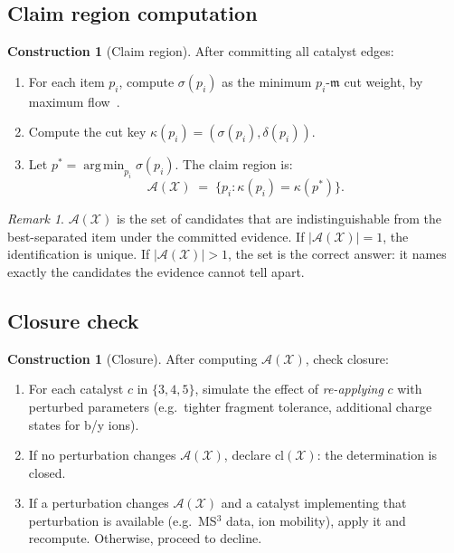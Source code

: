 \documentclass[11pt,a4paper]{article}
\theoremstyle{definition}
\newtheorem{construction}[theorem]{Construction}
\theoremstyle{remark}
\newtheorem{remark}[theorem]{Remark}
\newcommand{\med}{\mathfrak{m}}
\newcommand{\sep}{\sigma}
\newcommand{\dep}{\delta}
\newcommand{\key}{\kappa}
\newcommand{\clos}{\mathrm{cl}}
\newcommand{\amb}{\mathcal{A}}
\newcommand{\Spec}{\mathcal{X}}
\DeclareMathOperator*{\argmin}{arg\,min}
\begin{document}
\subsection{Claim region computation}

\begin{construction}[Claim region]
\label{con:claim}
After committing all catalyst edges:
\begin{enumerate}[leftmargin=2.0em,itemsep=1pt]
  \item For each item $p_i$, compute $\sep(p_i)$ as the minimum
  $p_i$-$\med$ cut weight, by maximum
  flow~\citep{fordfulkerson1956,goldberg1988new}.
  \item Compute the cut key $\key(p_i)=(\sep(p_i),\dep(p_i))$.
  \item Let $p^{\ast}=\argmin_{p_i}\sep(p_i)$. The claim region is:
  \[
    \amb(\Spec) \;=\; \{p_i : \key(p_i)=\key(p^{\ast})\}.
  \]
\end{enumerate}
\end{construction}

\begin{remark}
$\amb(\Spec)$ is the set of candidates that are indistinguishable from
the best-separated item under the committed evidence. If
$|\amb(\Spec)|=1$, the identification is unique. If $|\amb(\Spec)|>1$,
the set is the correct answer: it names exactly the candidates the
evidence cannot tell apart.
\end{remark}

\subsection{Closure check}

\begin{construction}[Closure]
\label{con:closure}
After computing $\amb(\Spec)$, check closure:
\begin{enumerate}[leftmargin=2.0em,itemsep=1pt]
  \item For each catalyst $c$ in $\{3,4,5\}$, simulate the effect of
  \emph{re-applying} $c$ with perturbed parameters (e.g.\ tighter
  fragment tolerance, additional charge states for b/y ions).
  \item If no perturbation changes $\amb(\Spec)$, declare
  $\clos(\Spec)$: the determination is closed.
  \item If a perturbation changes $\amb(\Spec)$ and a catalyst
  implementing that perturbation is available (e.g.\ MS$^3$ data,
  ion mobility), apply it and recompute. Otherwise, proceed to
  decline.
\end{enumerate}
\end{construction}
\end{document}
